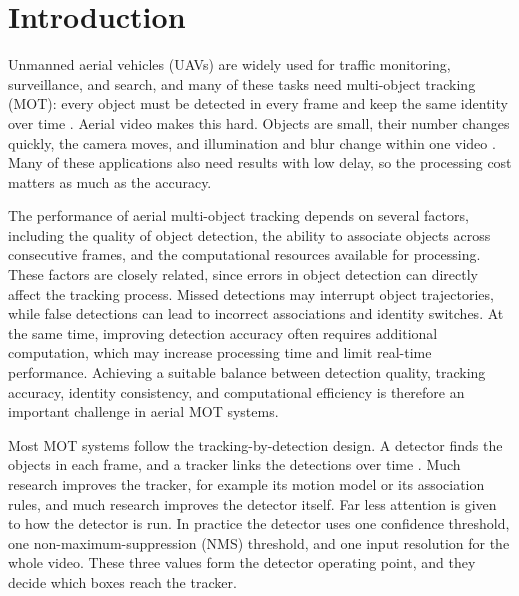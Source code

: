 \documentclass[pdflatex,sn-mathphys-num,iicol]{sn-jnl}
\begin{document}
\maketitle

\section{Introduction}\label{sec:intro}

Unmanned aerial vehicles (UAVs) are widely used for traffic monitoring,
surveillance, and search, and many of these tasks need multi-object tracking
(MOT): every object must be detected in every frame and keep the same
identity over time \cite{wu2022uavsurvey,zhu2022visdrone}. Aerial video makes
this hard. Objects are small, their number changes quickly, the camera moves,
and illumination and blur change within one video
\cite{zhu2022visdrone,du2018uavdt,cheng2023smallobject}. Many of these
applications also need results with low delay, so the processing cost matters
as much as the accuracy.

The performance of aerial multi-object tracking depends on several factors, including the quality of object detection, the ability to associate objects across consecutive frames, and the computational resources available for processing. These factors are closely related, since errors in object detection can directly affect the tracking process. Missed detections may interrupt object trajectories, while false detections can lead to incorrect associations and identity switches. At the same time, improving detection accuracy often requires additional computation, which may increase processing time and limit real-time performance. Achieving a suitable balance between detection quality, tracking accuracy, identity consistency, and computational efficiency is therefore an important challenge in aerial MOT systems.

Most MOT systems follow the tracking-by-detection design. A detector finds the
objects in each frame, and a tracker links the detections over time
\cite{bewley2016sort,zhang2022bytetrack}. Much research improves the tracker,
for example its motion model or its association rules, and much research
improves the detector itself. Far less attention is given to how the detector
is run. In practice the detector uses one confidence threshold, one
non-maximum-suppression (NMS) threshold, and one input resolution for the
whole video. These three values form the detector operating point, and they
decide which boxes reach the tracker.
\end{document}
